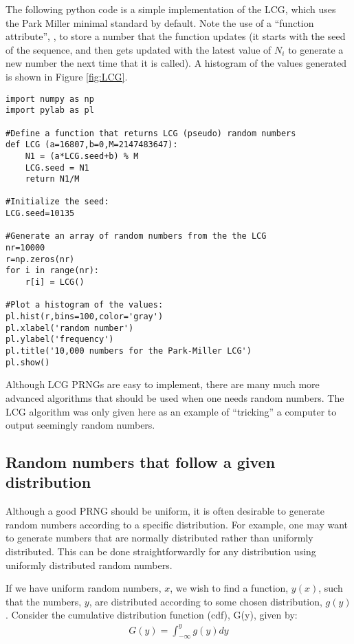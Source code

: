 The following python code is a simple implementation of the LCG, which uses the Park Miller minimal standard by default. Note the use of a ``function attribute'', , to store a number that the  function updates (it starts with the seed of the sequence, and then gets updated with the latest value of $N_i$ to generate a new number the next time that it is called). A histogram of the values generated is shown in Figure \ref{fig:LCG}.
\begin{lstlisting}[frame=single] 
import numpy as np
import pylab as pl

#Define a function that returns LCG (pseudo) random numbers
def LCG (a=16807,b=0,M=2147483647):
    N1 = (a*LCG.seed+b) % M
    LCG.seed = N1
    return N1/M

#Initialize the seed:
LCG.seed=10135

#Generate an array of random numbers from the the LCG
nr=10000
r=np.zeros(nr)
for i in range(nr):
    r[i] = LCG()

#Plot a histogram of the values:
pl.hist(r,bins=100,color='gray')
pl.xlabel('random number')
pl.ylabel('frequency')
pl.title('10,000 numbers for the Park-Miller LCG')
pl.show()
\end{lstlisting}


Although LCG PRNGs are easy to implement, there are many much more advanced algorithms that should be used when one needs random numbers. The LCG algorithm was only given here as an example of ``tricking'' a computer to output seemingly random numbers.

\subsection{Random numbers that follow a given distribution}
Although a good PRNG should be uniform, it is often desirable to generate random numbers according to a specific distribution. For example, one may want to generate numbers that are normally distributed rather than uniformly distributed. This can be done straightforwardly for any distribution using uniformly distributed random numbers.

If we have uniform random numbers, $x$, we wish to find a function, $y(x)$, such that the numbers, $y$, are distributed according to some chosen distribution, $g(y)$. Consider the cumulative distribution function (cdf), G(y), given by:
\begin{align*}
G(y) = \int_{-\infty}^y g(y)dy
\end{align*}

